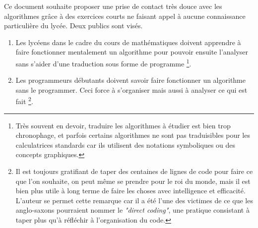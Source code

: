 Ce document souhaite proposer une prise de contact très douce avec les algorithmes grâce à des exercices courts ne faisant appel à aucune connaissance particulière du lycée. Deux publics sont visés.
\begin{enumerate}
	\item Les lycéens dans le cadre du cours de mathématiques doivent apprendre à faire fonctionner mentalement un algorithme pour pouvoir ensuite l'analyser sans s'aider d'une traduction sous forme de programme
\footnote{
	Très souvent en devoir, traduire les algorithmes à étudier est bien trop chronophage, et parfois certains algorithmes ne sont pas traduisibles pour les calculatrices standards car ils utilisent des notations symboliques ou des concepts graphiques.
}.

	\item Les programmeurs débutants doivent savoir faire fonctionner un algorithme sans le programmer. Ceci force à s'organiser mais aussi à analyser ce qui est fait
\footnote{
	Il est toujours gratifiant de taper des centaines de lignes de code pour faire ce que l'on souhaite, on peut même se prendre pour le roi du monde, mais il est bien plus utile à long terme de faire les choses avec intelligence et efficacité. L'auteur se permet cette remarque car il a été l'une des victimes de ce que les anglo-saxons pourraient nommer le \textit{"direct coding"}, une pratique consistant à taper plus qu'à réfléchir à l'organisation du code.
}.
\end{enumerate}